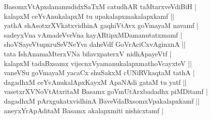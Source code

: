 \begin{entry}
\smallskip
\begin{shl}
BasomxVtApxdanamudidxSaTxM catudhAR taMtarxveVdiBiH |\\[1pt]
kalapxM ceYvAnukalapxM tu upakalapxmakalapxkamf ||\\[1pt]
yathA shAsotxrXVkatxvidhinA gaqhiVtAvx goVmayaM navamf |\\[1pt]
sadeyxVna vAmadeVveVna kayARtipxMDamanutatxmamf |\\[1pt]
shoVSayeVtupxruSeVNeYva daheVdf GoVrAciCxvAginxnA ||\\[1pt]
tata IshAnamaMterxVNa bilavxpaterxV nidhApayeVtf |\\[1pt]
kalapxM tadaBxsamx vijecnxVyamanukalapxmathoVcayxteV ||\\[1pt]
vaneVSu goVmayaM yacaCx shuSakxM cUNiRVkaqtaM tathA |\\[1pt]
dagadhxM ceYvAnukalApxKayxM ApaNAdi gataM tu yatf ||\\[1pt]
vasetxrXVNoVtAtxritaM Basamx goVmUtArxbadadhx piMDitamf |\\[1pt]
dagadhxM pArxgukatxvidhinA BaveVdaBxsomxVpakalapxkamf ||\\[1pt]
aneyxYrApAditaM Basamx akalapxmiti nishicxtamf |
\end{shl}
\smallskip
{}
\end{entry}

\begin{entry}
\end{entry}

\begin{entry}
\end{entry}

